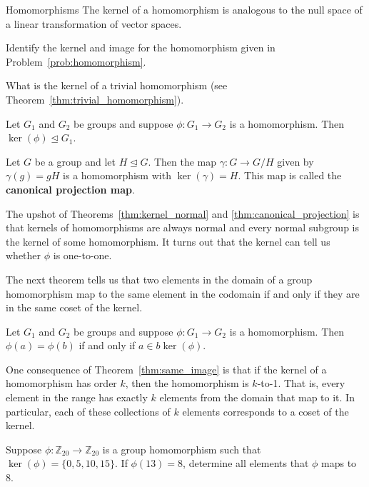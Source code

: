 \begin{section}{Homomorphisms}
The kernel of a homomorphism is analogous to the null space of a linear transformation of vector spaces.  

\begin{problem}
Identify the kernel and image for the homomorphism given in Problem~\ref{prob:homomorphism}.
\end{problem}

\begin{problem}
What is the kernel of a trivial homomorphism (see Theorem~\ref{thm:trivial_homomorphism}).
\end{problem}

\begin{theorem}\label{thm:kernel_normal}
Let $G_1$ and $G_2$ be groups and suppose $\phi:G_1\to G_2$ is a homomorphism. Then $\ker(\phi)\trianglelefteq G_1$.
\end{theorem}

\begin{theorem}\label{thm:canonical_projection}
Let $G$ be a group and let $H\trianglelefteq G$.  Then the map $\gamma:G\to G/H$ given by $\gamma(g)=gH$ is a homomorphism with $\ker(\gamma)=H$. This map is called the \textbf{canonical projection map}.
\end{theorem}

The upshot of Theorems~\ref{thm:kernel_normal} and \ref{thm:canonical_projection} is that kernels of homomorphisms are always normal and every normal subgroup is the kernel of some homomorphism. It turns out that the kernel can tell us whether $\phi$ is one-to-one.

The next theorem tells us that two elements in the domain of a group homomorphism map to the same element in the codomain if and only if they are in the same coset of the kernel.

\begin{theorem}\label{thm:same_image}
Let $G_1$ and $G_2$ be groups and suppose $\phi:G_1\to G_2$ is a homomorphism. Then $\phi(a) = \phi(b)$ if and only if $a\in b\ker(\phi)$.
\end{theorem}

One consequence of Theorem~\ref{thm:same_image} is that if the kernel of a homomorphism has order $k$, then the homomorphism is $k$-to-1.  That is, every element in the range has exactly $k$ elements from the domain that map to it.  In particular, each of these collections of $k$ elements corresponds to a coset of the kernel. 

\begin{problem}
Suppose $\phi:\mathbb{Z}_{20}\to\mathbb{Z}_{20}$ is a group homomorphism such that $\ker(\phi)=\{0,5,10,15\}$.  If $\phi(13)=8$, determine all elements that $\phi$ maps to 8.
\end{problem}


\end{section}
